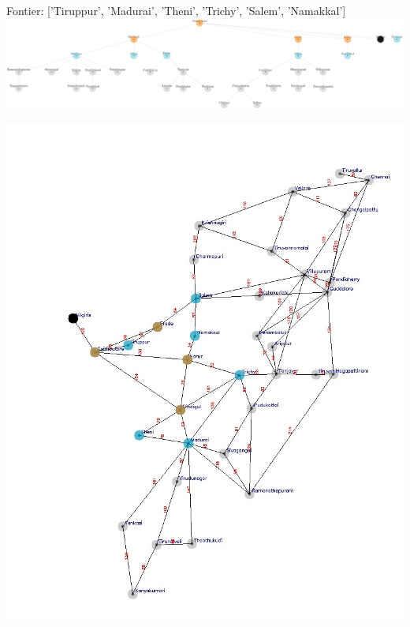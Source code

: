 \documentclass[xcolor=table]{beamer}
\begin{document}
\begin{frame}
  { \tiny Fontier: ['Tiruppur', 'Madurai', 'Theni', 'Trichy', 'Salem', 'Namakkal'] }
  \includegraphics[width=1\textwidth]{../BFSNodes/8-1.png}
  \begin{center}
    \includegraphics[height=0.6\textheight]{../BFSoutput/tamilBFS6.jpg}
  \end{center}
\end{frame}
\end{document}
